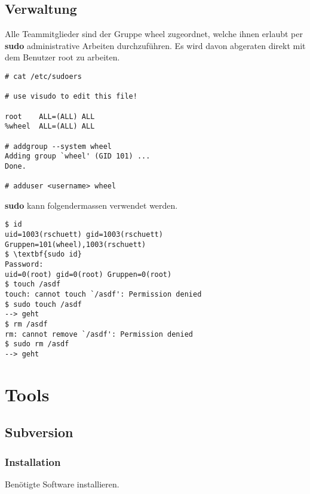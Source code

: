 \documentclass[12pt,halfparskip]{scrreprt}
\begin{document}

\section{Verwaltung} %
\label{sec:verwaltung}

Alle Teammitglieder sind der Gruppe wheel zugeordnet, welche ihnen erlaubt per \textbf{sudo} administrative Arbeiten durchzuführen. Es wird davon abgeraten direkt mit dem Benutzer root zu arbeiten.

\begin{verbatim}
# cat /etc/sudoers 

# use visudo to edit this file!

root    ALL=(ALL) ALL
%wheel  ALL=(ALL) ALL

# addgroup --system wheel
Adding group `wheel' (GID 101) ...
Done.

# adduser <username> wheel
\end{verbatim}

\textbf{sudo} kann folgendermassen verwendet werden.

\begin{verbatim}
$ id
uid=1003(rschuett) gid=1003(rschuett) Gruppen=101(wheel),1003(rschuett)
$ \textbf{sudo id}
Password:
uid=0(root) gid=0(root) Gruppen=0(root)
$ touch /asdf
touch: cannot touch `/asdf': Permission denied
$ sudo touch /asdf
--> geht
$ rm /asdf
rm: cannot remove `/asdf': Permission denied
$ sudo rm /asdf 
--> geht
\end{verbatim}




\chapter{Tools} %
\label{cha:tools}

\section{Subversion} %
\label{sec:subversion}

\subsection{Installation} %
\label{sub:installation-subversion}

Benötigte Software installieren.
\end{document}

